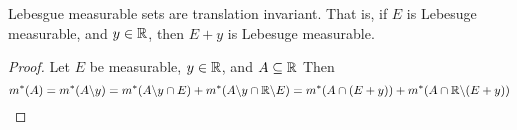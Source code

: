 \begin{lemma}\label{2.2.12}
    Lebesgue measurable sets are translation invariant. That is, if $E$ is
    Lebesuge measurable, and  $y \in \mathbb{R}$, then  $E+y$ is Lebesuge measurable.
\end{lemma}
\begin{proof}
    Let $E$ be measurable, $y \in \mathbb{R}$, and  $A \subseteq \mathbb{R}$ Then
    \begin{equation*}
        m^\ast(A)=m^\ast(A\backslash y)=m^\ast(A\backslash y \cap E)+m^\ast(A\backslash y
        \cap \mathbb{R}\backslash E)=m^\ast(A \cap (E+y))+m^\ast(A \cap \mathbb{R}\backslash(E+y))
    \end{equation*}
\end{proof}
